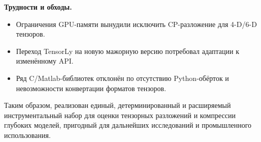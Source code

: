 \textbf{Трудности и обходы.}  
\begin{itemize}\setlength\itemsep{0.15em}
    \item Ограничения GPU-памяти вынудили исключить CP-разложение для 4-D/6-D тензоров.  
    \item Переход TensorLy на новую мажорную версию потребовал адаптации к изменённому API.  
    \item Ряд C/Matlab-библиотек отклонён по отсутствию Python-обёрток и невозможности конвертации форматов тензоров.  
\end{itemize}

Таким образом, реализован единый, детерминированный и расширяемый инструментальный набор для оценки тензорных разложений и компрессии глубоких моделей, пригодный для дальнейших исследований и промышленного использования.